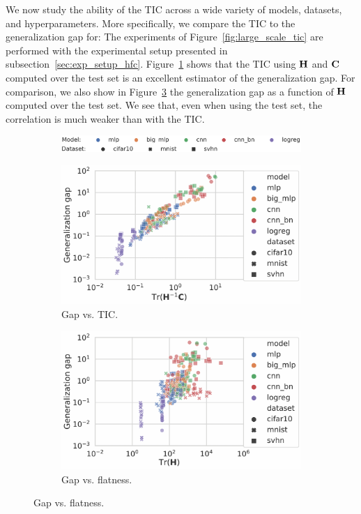 We now study the ability of the TIC across a wide variety of models, datasets, and hyperparameters. More specifically, we compare the TIC to the generalization gap for:
The experiments of Figure~\ref{fig:large_scale_tic} are performed with the experimental setup presented in subsection~\ref{sec:exp_setup_hfc}.
Figure~\ref{fig:tic_te} shows that the TIC using ${\mathbf{H}}$ and ${\mathbf{C}}$ computed over the test set is an excellent estimator of the generalization gap. For comparison, we also show in Figure~\ref{fig:flatness} the generalization gap as a function of ${\mathbf{H}}$ computed over the test set. We see that, even when using the test set, the correlation is much weaker than with the TIC.
\begin{figure}[ht]
\centering
\begin{subfigure}[b]{.92\textwidth}
    \includegraphics[trim={0mm 0mm 0mm 0mm},clip,width=\textwidth]{articles/hfc/legend_gimp.png}
  \end{subfigure}
  \centering
  \begin{subfigure}[b]{0.46\textwidth}
    \includegraphics[trim={0 0 60mm 0},clip,width=\textwidth]{articles/hfc/trhic750-2.pdf}
    \caption{ Gap vs. TIC.
    \label{fig:tic_te}}
  \end{subfigure}
    \hfill
      \begin{subfigure}[b]{0.46\textwidth}
    \includegraphics[trim={0 0 55mm 0},clip,width=\textwidth]{articles/hfc/trh750_te-2.pdf}
    \caption{ Gap vs. flatness.
    \label{fig:flatness}}
  \end{subfigure}
  

\end{figure}
